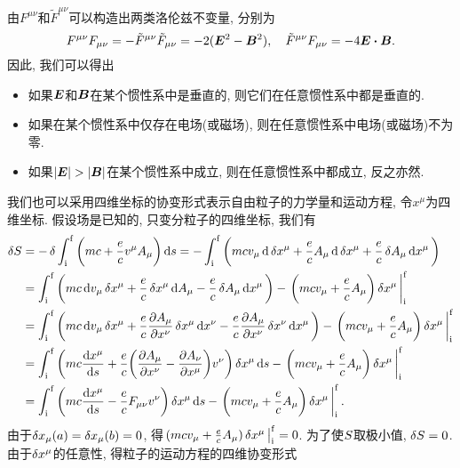 由$ F^{\mu\nu} $和$ \tilde{F}^{\mu\nu} $可以构造出两类洛伦兹不变量, 分别为
\begin{equation*}
    F^{\mu\nu}F_{\mu\nu} = -\tilde{F}^{\mu\nu}\tilde{F}_{\mu\nu} = -2(\vb*{E}^2-\vb*{B}^2), \quad \tilde{F}^{\mu\nu}F_{\mu\nu} = -4 \vb*{E} \vdot \vb*{B}.
\end{equation*}
因此, 我们可以得出
\begin{itemize}
    \item 如果$ \vb*{E} $和$ \vb*{B} $在某个惯性系中是垂直的, 则它们在任意惯性系中都是垂直的.
    \item 如果在某个惯性系中仅存在电场(或磁场), 则在任意惯性系中电场(或磁场)不为零.
    \item 如果$ \abs{\vb*{E}} > \abs{\vb*{B}} $在某个惯性系中成立, 则在任意惯性系中都成立, 反之亦然.
\end{itemize}
我们也可以采用四维坐标的协变形式表示自由粒子的力学量和运动方程, 令$ x^{\mu} $为四维坐标. 假设场是已知的, 只变分粒子的四维坐标, 我们有
\begin{align*}
    \var{\action} &= - \var{\int_{\init}^{\fini} \bigg(mc + \frac{e}{c} v^{\mu} A_{\mu}\bigg) \dd{s}}
    = -\int_{\init}^{\fini} \bigg(mc v_{\mu} \dd{\var{x^{\mu}}} + \frac{e}{c} A_{\mu} \dd{\var{x^{\mu}}} + \frac{e}{c} \var{A_{\mu}} \dd{x^{\mu}}\bigg) \\
    &= \int_{\init}^{\fini} \bigg(mc \dd{v_{\mu}} \var{x^{\mu}} + \frac{e}{c} \var{x^{\mu}} \dd{A_{\mu}} - \frac{e}{c} \var{A_{\mu}} \dd{x^{\mu}} \bigg) - \eval{\bigg(mcv_{\mu} + \frac{e}{c}A_{\mu}\bigg) \var{x^{\mu}}}_{\init}^{\fini}\\
    &= \int_{\init}^{\fini} \bigg(mc \dd{v_{\mu}} \var{x^{\mu}} + \frac{e}{c} \pdv{A_{\mu}}{x^{\nu}} \var{x^{\mu}} \dd{x^{\nu}} - \frac{e}{c} \pdv{A_{\mu}}{x^{\nu}} \var{x^{\nu}} \dd{x^{\mu}} \bigg) - \eval{\bigg(mcv_{\mu} + \frac{e}{c}A_{\mu}\bigg) \var{x^{\mu}}}_{\init}^{\fini}\\
    &= \int_{\init}^{\fini} \bigg(mc \dv{x^{\mu}}{s} + \frac{e}{c} \bigg(\pdv{A_{\mu}}{x^{\nu}} - \pdv{A_{\nu}}{x^{\mu}}\bigg) v^{\nu} \bigg) \var{x^{\mu}} \dd{s} - \eval{\bigg(mcv_{\mu} + \frac{e}{c}A_{\mu}\bigg) \var{x^{\mu}}}_{\init}^{\fini}\\
    &= \int_{\init}^{\fini} \bigg(mc \dv{x^{\mu}}{s} - \frac{e}{c} F_{\mu\nu} v^{\nu} \bigg) \var{x^{\mu}} \dd{s} - \eval{\bigg(mcv_{\mu} + \frac{e}{c}A_{\mu}\bigg) \var{x^{\mu}}}_{\init}^{\fini}.
\end{align*}
由于$ \var{x_{\mu}(a)}=\var{x_{\mu}(b)}=0 $, 得$ \eval{(mcv_{\mu} + \frac{e}{c}A_{\mu}) \var{x^{\mu}}}_{\init}^{\fini}=0 $. 为了使$ S $取极小值, $ \var{S}=0 $. 由于$ \var{x^{\mu}} $的任意性, 得粒子的运动方程的四维协变形式
